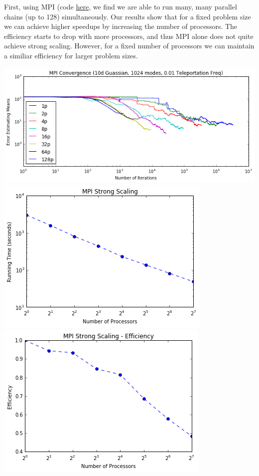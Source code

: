 \documentclass{article}
\begin{document}
First, using MPI (code
\href{https://github.com/asross/cs205-project/blob/master/odyssey_setup/mpi_mcmc/mpi_mcmc.py}{here},
we find we are able to run many, many parallel chains (up to 128)
simultaneously. Our results show that for a fixed problem size we can achieve
higher speedups by increasing the number of processors. The efficiency starts
to drop with more processors, and thus MPI alone does not quite achieve strong
scaling. However, for a fixed number of processors we can maintain a similiar
efficiency for larger problem sizes.

\includegraphics[width=\textwidth]{mpi-conv.png}
\includegraphics[width=\textwidth]{mpi-strong-scale1.png}
\includegraphics[width=\textwidth]{mpi-strong-scale2.png}
\end{document}
